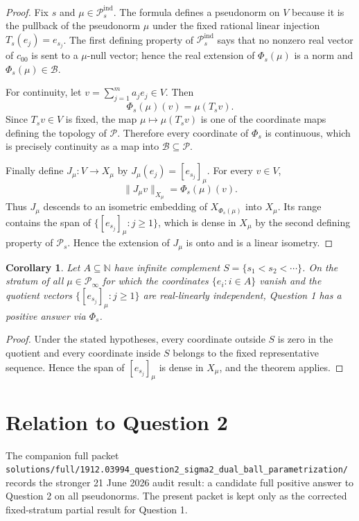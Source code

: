 \documentclass[11pt]{article}
\newtheorem{corollary}[theorem]{Corollary}
\newcommand{\PP}{\mathcal P}
\newcommand{\BB}{\mathcal B}
\newcommand{\Nat}{\mathbb N}
\begin{document}
\begin{proof}
Fix \(s\) and \(\mu\in\PP_s^{\mathrm{ind}}\). The formula defines a pseudonorm on \(V\)
because it is the pullback of the pseudonorm \(\mu\) under the fixed rational
linear injection \(T_s(e_j)=e_{s_j}\). The first defining property of
\(\PP_s^{\mathrm{ind}}\) says that no nonzero real vector of \(c_{00}\) is
sent to a \(\mu\)-null vector; hence the real extension of
\(\Phi_s(\mu)\) is a norm and \(\Phi_s(\mu)\in\BB\).

For continuity, let \(v=\sum_{j=1}^m a_j e_j\in V\). Then
\[
\Phi_s(\mu)(v)=\mu(T_s v).
\]
Since \(T_s v\in V\) is fixed, the map \(\mu\mapsto \mu(T_s v)\) is one of
the coordinate maps defining the topology of \(\PP\). Therefore every
coordinate of \(\Phi_s\) is continuous, which is precisely continuity as a map
into \(\BB\subseteq\PP\).

Finally define \(J_\mu:V\to X_\mu\) by \(J_\mu(e_j)=[e_{s_j}]_\mu\). For
every \(v\in V\),
\[
\|J_\mu v\|_{X_\mu}=\Phi_s(\mu)(v).
\]
Thus \(J_\mu\) descends to an isometric embedding of \(X_{\Phi_s(\mu)}\) into
\(X_\mu\). Its range contains the span of \(\{[e_{s_j}]_\mu:j\ge1\}\), which
is dense in \(X_\mu\) by the second defining property of \(\PP_s\). Hence the
extension of \(J_\mu\) is onto and is a linear isometry.
\end{proof}

\begin{corollary}
Let \(A\subseteq\Nat\) have infinite complement \(S=\{s_1<s_2<\cdots\}\). On
the stratum of all \(\mu\in\PP_\infty\) for which the coordinates
\(\{e_i:i\in A\}\) vanish and the quotient vectors
\(\{[e_{s_j}]_\mu:j\ge1\}\) are real-linearly independent, Question 1 has a
positive answer via \(\Phi_s\).
\end{corollary}

\begin{proof}
Under the stated hypotheses, every coordinate outside \(S\) is zero in the
quotient and every coordinate inside \(S\) belongs to the fixed representative
sequence. Hence the span of \([e_{s_j}]_\mu\) is dense in \(X_\mu\), and the
theorem applies.
\end{proof}

\section*{Relation to Question 2}

The companion full packet
\texttt{solutions/full/1912.03994\_question2\_sigma2\_dual\_ball\_parametrization/}
records the stronger 21 June 2026 audit result: a candidate full positive
answer to Question 2 on all pseudonorms.  The present packet is kept only as
the corrected fixed-stratum partial result for Question 1.
\end{document}
